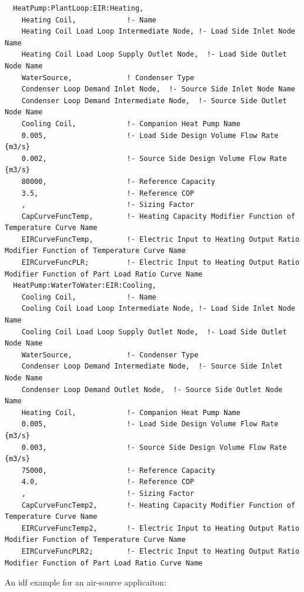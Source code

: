 \begin{lstlisting}
  HeatPump:PlantLoop:EIR:Heating,
    Heating Coil,            !- Name
    Heating Coil Load Loop Intermediate Node, !- Load Side Inlet Node Name
    Heating Coil Load Loop Supply Outlet Node,  !- Load Side Outlet Node Name
    WaterSource,             ! Condenser Type
    Condenser Loop Demand Inlet Node,  !- Source Side Inlet Node Name
    Condenser Loop Demand Intermediate Node,  !- Source Side Outlet Node Name
    Cooling Coil,            !- Companion Heat Pump Name
    0.005,                   !- Load Side Design Volume Flow Rate {m3/s}
    0.002,                   !- Source Side Design Volume Flow Rate {m3/s}
    80000,                   !- Reference Capacity
    3.5,                     !- Reference COP
    ,                        !- Sizing Factor
    CapCurveFuncTemp,        !- Heating Capacity Modifier Function of Temperature Curve Name
    EIRCurveFuncTemp,        !- Electric Input to Heating Output Ratio Modifier Function of Temperature Curve Name
    EIRCurveFuncPLR;         !- Electric Input to Heating Output Ratio Modifier Function of Part Load Ratio Curve Name
  HeatPump:WaterToWater:EIR:Cooling,
    Cooling Coil,            !- Name
    Cooling Coil Load Loop Intermediate Node, !- Load Side Inlet Node Name
    Cooling Coil Load Loop Supply Outlet Node,  !- Load Side Outlet Node Name
    WaterSource,             !- Condenser Type
    Condenser Loop Demand Intermediate Node,  !- Source Side Inlet Node Name
    Condenser Loop Demand Outlet Node,  !- Source Side Outlet Node Name
    Heating Coil,            !- Companion Heat Pump Name
    0.005,                   !- Load Side Design Volume Flow Rate {m3/s}
    0.003,                   !- Source Side Design Volume Flow Rate {m3/s}
    75000,                   !- Reference Capacity
    4.0,                     !- Reference COP
    ,                        !- Sizing Factor
    CapCurveFuncTemp2,       !- Heating Capacity Modifier Function of Temperature Curve Name
    EIRCurveFuncTemp2,       !- Electric Input to Heating Output Ratio Modifier Function of Temperature Curve Name
    EIRCurveFuncPLR2;        !- Electric Input to Heating Output Ratio Modifier Function of Part Load Ratio Curve Name
\end{lstlisting}

An idf example for an air-source applicaiton:

